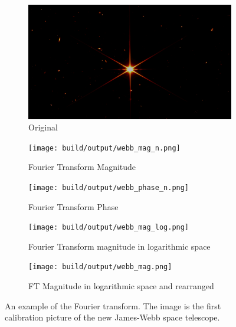 \begin{figure}[htbp]
    \centering
    \begin{subfigure}[h]{.9\linewidth}
        \centering
        \includegraphics[width=\linewidth]{images/webb.png}
        \caption{Original}
    \end{subfigure}
    \begin{subfigure}[h]{.9\linewidth}
        \centering
        \texttt{[image: build/output/webb\_mag\_n.png]}
        \caption{Fourier Transform Magnitude}
        \label{subfig:ftm_n}
    \end{subfigure}
    \begin{subfigure}[h]{.9\linewidth}
        \centering
        \texttt{[image: build/output/webb\_phase\_n.png]}
        \caption{Fourier Transform Phase}
        \label{subfig:ftp_n}
    \end{subfigure}
    \begin{subfigure}[h]{.9\linewidth}
        \centering
        \texttt{[image: build/output/webb\_mag\_log.png]}
        \caption{Fourier Transform magnitude in logarithmic space}
        \label{subfig:ftm_log}
    \end{subfigure}
    \begin{subfigure}[h]{.9\linewidth}
        \centering
        \texttt{[image: build/output/webb\_mag.png]}
        \caption{FT Magnitude in logarithmic space and rearranged}
        \label{subfig:ftm}
    \end{subfigure}
    \caption{An example of the Fourier transform. The image is the first calibration picture of the new James-Webb space telescope. }
    \label{fig:fourier_example_n}
\end{figure}

